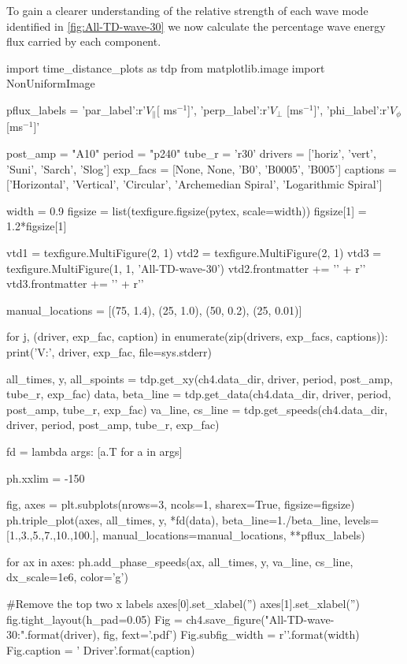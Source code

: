 To gain a clearer understanding of the relative strength of each wave mode identified in \cref{fig:All-TD-wave-30} we now calculate the percentage wave energy flux carried by each component.

\begin{pycode}[chapter4]
import time_distance_plots as tdp
from matplotlib.image import NonUniformImage

pflux_labels = {'par_label':r'$V_\parallel[$ ms$^{-1}$]', 
                'perp_label':r'$V_\perp$ [ms$^{-1}$]',
                'phi_label':r'$V_\phi$ [ms$^{-1}$]'}

post_amp = "A10"
period = "p240"
tube_r = 'r30'
drivers = ['horiz', 'vert', 'Suni', 'Sarch', 'Slog']
exp_facs = [None, None, 'B0', 'B0005', 'B005']
captions = ['Horizontal', 'Vertical', 'Circular', 'Archemedian Spiral', 'Logarithmic Spiral']

width = 0.9
figsize = list(texfigure.figsize(pytex, scale=width))
figsize[1] = 1.2*figsize[1]

vtd1 = texfigure.MultiFigure(2, 1)
vtd2 = texfigure.MultiFigure(2, 1)
vtd3 = texfigure.MultiFigure(1, 1, 'All-TD-wave-30')
vtd2.frontmatter += '\n' + r'\ContinuedFloat'
vtd3.frontmatter += '\n' + r'\ContinuedFloat'

manual_locations = [(75, 1.4), (25, 1.0), (50, 0.2), (25, 0.01)]

for j, (driver, exp_fac, caption) in enumerate(zip(drivers, exp_facs, captions)):
    print('V:', driver, exp_fac, file=sys.stderr)
    
    all_times, y, all_spoints = tdp.get_xy(ch4.data_dir, driver, period, post_amp, tube_r, exp_fac)
    data, beta_line = tdp.get_data(ch4.data_dir, driver, period, post_amp, tube_r, exp_fac)
    va_line, cs_line = tdp.get_speeds(ch4.data_dir, driver, period, post_amp, tube_r, exp_fac)
    
    fd = lambda args: [a.T for a in args]
       
    ph.xxlim = -150
    
    fig, axes = plt.subplots(nrows=3, ncols=1, sharex=True, figsize=figsize)
    ph.triple_plot(axes, all_times, y, *fd(data), beta_line=1./beta_line,
                   levels=[1.,3.,5.,7.,10.,100.], manual_locations=manual_locations, **pflux_labels)
    
    for ax in axes:
        ph.add_phase_speeds(ax, all_times, y, va_line, cs_line, dx_scale=1e6, color='g')
        
    #Remove the top two x labels
    axes[0].set_xlabel('')
    axes[1].set_xlabel('')
    fig.tight_layout(h_pad=0.05)
    Fig = ch4.save_figure("All-TD-wave-30:{}".format(driver), fig, fext='.pdf')
    Fig.subfig_width = r'{}\columnwidth'.format(width)
    Fig.caption = '{} Driver'.format(caption)
    

\end{pycode}
